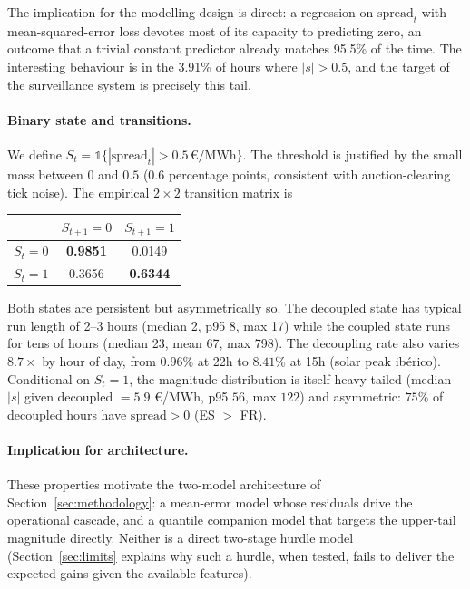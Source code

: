 \documentclass[11pt,a4paper]{article}
\begin{document}
The implication for the modelling design is direct: a regression on
$\mathrm{spread}_t$ with mean-squared-error loss devotes most of its
capacity to predicting zero, an outcome that a trivial constant
predictor already matches 95.5\% of the time. The interesting
behaviour is in the 3.91\% of hours where $|s| > 0.5$, and the
target of the surveillance system is precisely this tail.

\paragraph{Binary state and transitions.} We define
$S_t = \mathbb{1}\{|\mathrm{spread}_t| > 0.5\,\text{€/MWh}\}$. The
threshold is justified by the small mass between $0$ and $0.5$
(0.6 percentage points, consistent with auction-clearing tick noise).
The empirical $2 \times 2$ transition matrix is

\begin{table}[H]
\centering
\small
\begin{tabular}{lcc}
\toprule
 & $S_{t+1} = 0$ & $S_{t+1} = 1$ \\
\midrule
$S_t = 0$ & \textbf{0.9851} & 0.0149 \\
$S_t = 1$ & 0.3656 & \textbf{0.6344} \\
\bottomrule
\end{tabular}
\end{table}

Both states are persistent but asymmetrically so. The decoupled
state has typical run length of 2--3 hours (median 2, p95 8, max 17)
while the coupled state runs for tens of hours (median 23, mean 67,
max 798). The decoupling rate also varies $8.7\times$ by hour of
day, from $0.96\%$ at 22h to $8.41\%$ at 15h (solar peak ibérico).
Conditional on $S_t = 1$, the magnitude distribution is itself
heavy-tailed (median $|s|$ given decoupled $= 5.9$ €/MWh, p95 $56$,
max $122$) and asymmetric: $75\%$ of decoupled hours have
$\mathrm{spread} > 0$ (ES $>$ FR).

\paragraph{Implication for architecture.} These properties motivate
the two-model architecture of Section~\ref{sec:methodology}: a
mean-error model whose residuals drive the operational cascade, and
a quantile companion model that targets the upper-tail magnitude
directly. Neither is a direct two-stage hurdle model
(Section~\ref{sec:limits} explains why such a hurdle, when tested,
fails to deliver the expected gains given the available features).
\end{document}
